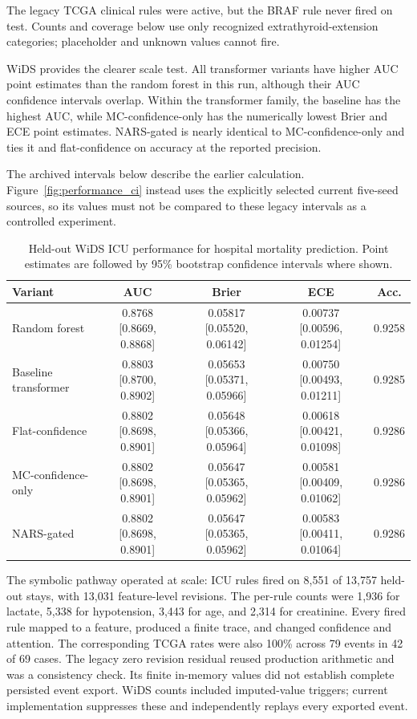 The legacy TCGA clinical rules were active, but the BRAF rule never fired on test. Counts and coverage below use only recognized extrathyroid-extension categories; placeholder and unknown values cannot fire.

WiDS provides the clearer scale test. All transformer variants have higher AUC point estimates than the random forest in this run, although their AUC confidence intervals overlap. Within the transformer family, the baseline has the highest AUC, while MC-confidence-only has the numerically lowest Brier and ECE point estimates. NARS-gated is nearly identical to MC-confidence-only and ties it and flat-confidence on accuracy at the reported precision.

The archived intervals below describe the earlier calculation. Figure~\ref{fig:performance_ci} instead uses the explicitly selected current five-seed sources, so its values must not be compared to these legacy intervals as a controlled experiment.

\begin{table}[t]
\caption{Held-out WiDS ICU performance for hospital mortality prediction. Point estimates are followed by 95\% bootstrap confidence intervals where shown.}
\label{tab:wids_results}
\centering
\scriptsize
\setlength{\tabcolsep}{2.5pt}
\begin{tabular}{@{}lcccc@{}}
\toprule
Variant & AUC & Brier & ECE & Acc. \\
\midrule
Random forest & 0.8768 [0.8669, 0.8868] & 0.05817 [0.05520, 0.06142] & 0.00737 [0.00596, 0.01254] & 0.9258 \\
Baseline transformer & 0.8803 [0.8700, 0.8902] & 0.05653 [0.05371, 0.05966] & 0.00750 [0.00493, 0.01211] & 0.9285 \\
Flat-confidence & 0.8802 [0.8698, 0.8901] & 0.05648 [0.05366, 0.05964] & 0.00618 [0.00421, 0.01098] & 0.9286 \\
MC-confidence-only & 0.8802 [0.8698, 0.8901] & 0.05647 [0.05365, 0.05962] & 0.00581 [0.00409, 0.01062] & 0.9286 \\
NARS-gated & 0.8802 [0.8698, 0.8901] & 0.05647 [0.05365, 0.05962] & 0.00583 [0.00411, 0.01064] & 0.9286 \\
\bottomrule
\end{tabular}
\end{table}



The symbolic pathway operated at scale: ICU rules fired on 8,551 of 13,757 held-out stays, with 13,031 feature-level revisions. The per-rule counts were 1,936 for lactate, 5,338 for hypotension, 3,443 for age, and 2,314 for creatinine. Every fired rule mapped to a feature, produced a finite trace, and changed confidence and attention. The corresponding TCGA rates were also 100\% across 79 events in 42 of 69 cases. The legacy zero revision residual reused production arithmetic and was a consistency check. Its finite in-memory values did not establish complete persisted event export. WiDS counts included imputed-value triggers; current implementation suppresses these and independently replays every exported event.

